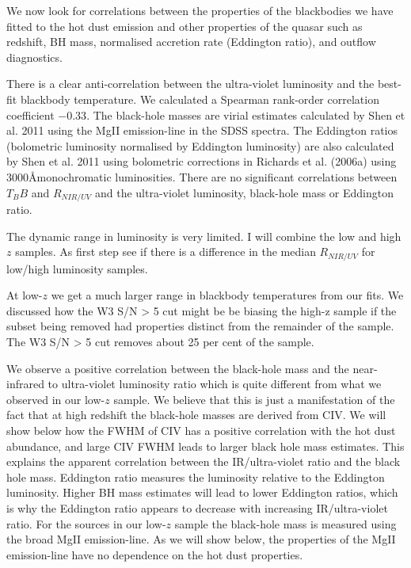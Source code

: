 We now look for correlations between the properties of the blackbodies we have fitted to the hot dust emission and other properties of the quasar such as redshift, BH mass, normalised accretion rate (Eddington ratio), and outflow diagnostics.  

There is a clear anti-correlation between the ultra-violet luminosity and the best-fit blackbody temperature. 
We calculated a Spearman rank-order correlation coefficient $-0.33$. 
The black-hole masses are virial estimates calculated by Shen et al. 2011 using the MgII emission-line in the SDSS spectra. 
The Eddington ratios (bolometric luminosity normalised by Eddington luminosity) are also calculated by Shen et al. 2011 using bolometric corrections in Richards et al. (2006a) using 3000\AA monochromatic luminosities. 
There are no significant correlations between $T_BB$ and $R_{NIR/UV}$ and the ultra-violet luminosity, black-hole mass or Eddington ratio. 

The dynamic range in luminosity is very limited. 
I will combine the low and high $z$ samples. 
As first step see if there is a difference in the median $R_{NIR/UV}$ for low/high luminosity samples. 

At low-$z$  we get a much larger range in blackbody temperatures from our fits. 
We discussed how the W3 S/N > 5 cut might be be biasing the high-z sample if the subset being removed had properties distinct from the remainder of the sample. 
The W3 S/N > 5 cut removes about 25 per cent of the sample. 

We observe a positive correlation between the black-hole mass and the near-infrared to ultra-violet luminosity ratio which is quite different from what we observed in our low-$z$ sample. 
We believe that this is just a manifestation of the fact that at high redshift the black-hole masses are derived from CIV. 
We will show below how the FWHM of CIV has a positive correlation with the hot dust abundance, and large CIV FWHM leads to larger black hole mass estimates. 
This explains the apparent correlation between the IR/ultra-violet ratio and the black hole mass. 
Eddington ratio measures the luminosity relative to the Eddington luminosity. 
Higher BH mass estimates will lead to lower Eddington ratios, which is why the Eddington ratio appears to decrease with increasing IR/ultra-violet ratio. 
For the sources in our low-$z$ sample the black-hole mass is measured using the broad MgII emission-line. 
As we will show below, the properties of the MgII emission-line have no dependence on the hot dust properties. 


